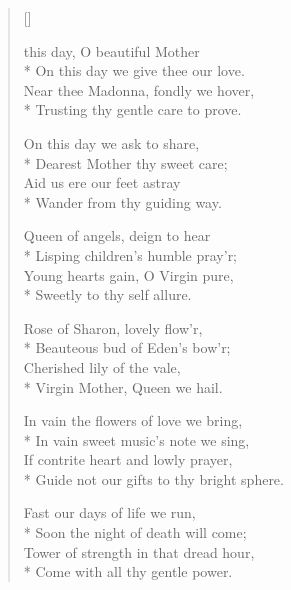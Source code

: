 \newHymn

\begin{verse}[\versewidth]
\JustHymnNumInVerse
\begin{indentedVerse}
\vin {} this day, O beautiful Mother\\*
\vin On this day we give thee our love.\\
\vin Near thee Madonna, fondly we hover,\\*
\vin Trusting thy gentle care to prove.
\end{indentedVerse}

 On this day we ask to share,\\*
Dearest Mother thy sweet care;\\
Aid us ere our feet astray\\*
Wander from thy guiding way.

 Queen of angels, deign to hear\\*
Lisping children's humble pray'r;\\
Young hearts gain, O Virgin pure,\\*
Sweetly to thy self allure.

Rose of Sharon, lovely flow'r,\\*
Beauteous bud of Eden's bow'r;\\
Cherished lily of the vale,\\*
Virgin Mother, Queen we hail.

 In vain the flowers of love we bring,\\*
In vain sweet music's note we sing,\\
If contrite heart and lowly prayer,\\*
Guide not our gifts to thy bright sphere.

 Fast our days of life we run,\\*
Soon the night of death will come;\\
Tower of strength in that dread hour,\\*
Come with all thy gentle power.

\end{verse}

